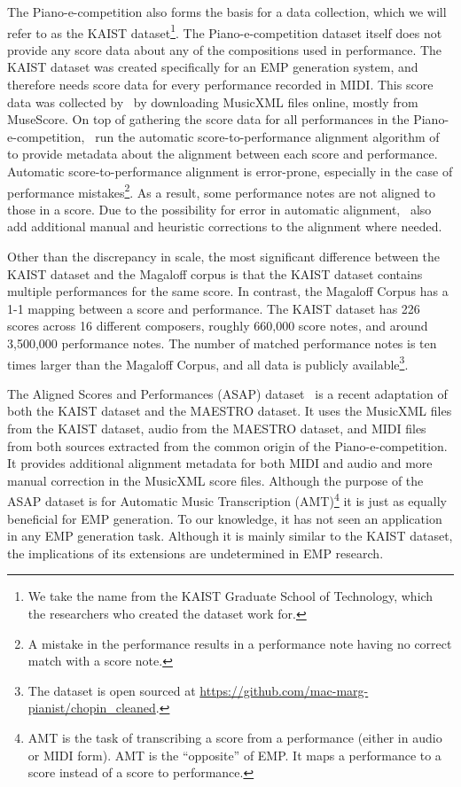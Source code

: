 The Piano-e-competition also forms the basis for a data collection, which we will refer to as the KAIST dataset\footnote{We take the name from the KAIST Graduate School of Technology, which the researchers who created the dataset work for.}. The Piano-e-competition dataset itself does not provide any score data about any of the compositions used in performance. The KAIST dataset was created specifically for an EMP generation system, and therefore needs score data for every performance recorded in MIDI. This score data was collected by~\citet{jeong2019virtuosonet} by downloading MusicXML files online, mostly from MuseScore. On top of gathering the score data for all performances in the Piano-e-competition,~\citet{jeong2019virtuosonet} run the automatic score-to-performance alignment algorithm of~\citet{nakamura2017performance} to provide metadata about the alignment between each score and performance. Automatic score-to-performance alignment is error-prone, especially in the case of performance mistakes\footnote{A mistake in the performance results in a performance note having no correct match with a score note.}. As a result, some performance notes are not aligned to those in a score. Due to the possibility for error in automatic alignment,~\citet{jeong2019virtuosonet} also add additional manual and heuristic corrections to the alignment where needed. 

Other than the discrepancy in scale, the most significant difference between the KAIST dataset and the Magaloff corpus is that the KAIST dataset contains multiple performances for the same score. In contrast, the Magaloff Corpus has a 1-1 mapping between a score and performance. The KAIST dataset has 226 scores across 16 different composers, roughly 660,000 score notes, and around 3,500,000 performance notes. The number of matched performance notes is ten times larger than the Magaloff Corpus, and all data is publicly available\footnote{The dataset is open sourced at \url{https://github.com/mac-marg-pianist/chopin_cleaned}.}. 

The Aligned Scores and Performances (ASAP) dataset~\cite{foscarin2020asap} is a recent adaptation of both the KAIST dataset and the MAESTRO dataset. It uses the MusicXML files from the KAIST dataset, audio from the MAESTRO dataset, and MIDI files from both sources extracted from the common origin of the Piano-e-competition. It provides additional alignment metadata for both MIDI and audio and more manual correction in the MusicXML score files. Although the purpose of the ASAP dataset is for Automatic Music Transcription (AMT)\footnote{AMT is the task of transcribing a score from a performance (either in audio or MIDI form). AMT is the ``opposite'' of EMP. It maps a performance to a score instead of a score to performance.} it is just as equally beneficial for EMP generation. To our knowledge, it has not seen an application in any EMP generation task. Although it is mainly similar to the KAIST dataset, the implications of its extensions are undetermined in EMP research. 


